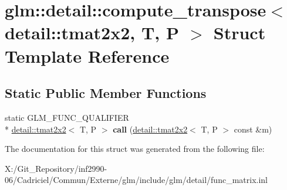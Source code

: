 \hypertarget{structglm_1_1detail_1_1compute__transpose_3_01detail_1_1tmat2x2_00_01_t_00_01_p_01_4}{\section{glm\-:\-:detail\-:\-:compute\-\_\-transpose$<$ detail\-:\-:tmat2x2, T, P $>$ Struct Template Reference}
\label{structglm_1_1detail_1_1compute__transpose_3_01detail_1_1tmat2x2_00_01_t_00_01_p_01_4}
}
\subsection*{Static Public Member Functions}
\begin{DoxyCompactItemize}
\item 
\hypertarget{structglm_1_1detail_1_1compute__transpose_3_01detail_1_1tmat2x2_00_01_t_00_01_p_01_4_a213c7106f07140855ec81d916ae5f629}{static G\-L\-M\-\_\-\-F\-U\-N\-C\-\_\-\-Q\-U\-A\-L\-I\-F\-I\-E\-R \\*
\hyperlink{structglm_1_1detail_1_1tmat2x2}{detail\-::tmat2x2}$<$ T, P $>$ {\bfseries call} (\hyperlink{structglm_1_1detail_1_1tmat2x2}{detail\-::tmat2x2}$<$ T, P $>$ const \&m)}\label{structglm_1_1detail_1_1compute__transpose_3_01detail_1_1tmat2x2_00_01_t_00_01_p_01_4_a213c7106f07140855ec81d916ae5f629}

\end{DoxyCompactItemize}


The documentation for this struct was generated from the following file\-:\begin{DoxyCompactItemize}
\item 
X\-:/\-Git\-\_\-\-Repository/inf2990-\/06/\-Cadriciel/\-Commun/\-Externe/glm/include/glm/detail/func\-\_\-matrix.\-inl\end{DoxyCompactItemize}
